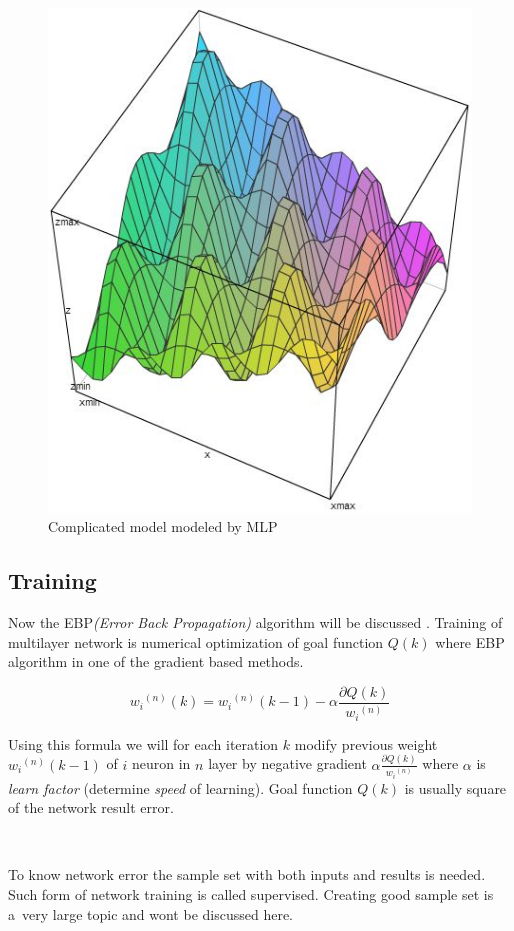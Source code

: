 \begin{figure}[!h]
    \centering
    \includegraphics[scale=0.8]{Media/SolutionGraph.png}
    \caption{Complicated model modeled by MLP}
    \label{fig:SolutionGraph}
\end{figure}

\newpage
\subsection{Training}
\label{sec:Training}

Now the EBP\textit{(Error Back Propagation)} algorithm will be discussed \cite{mlpPawelRosczak,mlpFSaC,fsmlpDwrSkrMk,sRpNAI369}.
Training of multilayer network is numerical optimization of goal function $Q(k)$ where EBP algorithm in one of the gradient based methods.

\begin{mycapequ}[!ht]
    $$ {w_i}^{(n)}(k) = {w_i}^{(n)}(k-1)-\alpha\frac{\partial Q(k)}{{w_i}^{(n)}} $$
    \caption{Error Back Propagation \cite{mlpPawelRosczak}}
    \label{formula:EBP}
\end{mycapequ}

Using this formula we will for each iteration $k$ modify previous weight ${w_i}^{(n)}(k-1)$ of $i$ neuron in $n$ layer by negative gradient $\displaystyle{\alpha\frac{\partial Q(k)}{{w_i}^{(n)}}}$ where $\alpha$ is \textit{learn factor} (determine \textit{speed} of learning).
Goal function $Q(k)$ is usually square of the network result error.

\ 


To know network error the sample set with both inputs and results is needed. Such form of network training is called supervised. Creating good sample set is a~very large topic and wont be discussed here.
